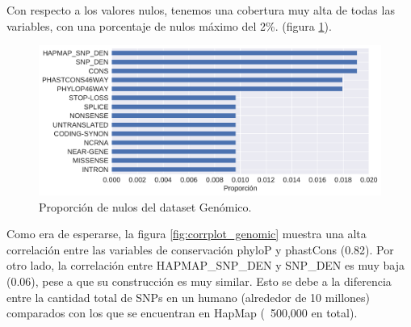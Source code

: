 
Con respecto a los valores nulos, tenemos una cobertura muy alta de todas las variables, con una porcentaje de nulos máximo del 2\%. (figura \ref{fig:proporcion_nulos_genomic}).

\begin{figure}[H]
    \centering
    \includegraphics[scale=0.5]{documents/latex/figures/3/genomic/proporcion_nulos_genomic.pdf}
    \caption{Proporción de nulos del dataset Genómico.}
    \label{fig:proporcion_nulos_genomic}
\end{figure}

Como era de esperarse, la figura \ref{fig:corrplot_genomic} muestra una alta correlación entre las variables de conservación phyloP y phastCons (0.82). Por otro lado, la correlación entre HAPMAP\_SNP\_DEN y SNP\_DEN es muy baja (0.06), pese a que su construcción es muy similar. Esto se debe a la diferencia entre la cantidad total de SNPs en un humano (alrededor de 10 millones) comparados con los que se encuentran en HapMap (~500,000 en total).

